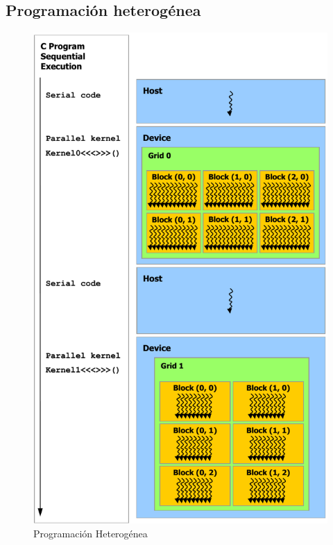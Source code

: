 \subsection{Programación heterogénea}

\begin{figure}[h]
			\centering
				\includegraphics[scale=0.35]{img/PH.png}
			\caption{Programación Heterogénea \cite{Flops}}
\end{figure}

